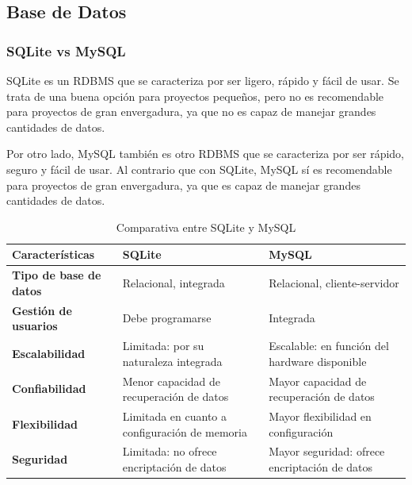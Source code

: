        \subsection{Base de Datos}
        
            \subsubsection{SQLite vs MySQL}

                SQLite \cite{sqlite} es un RDBMS que se caracteriza por ser ligero, rápido y fácil de usar. Se trata de una buena opción para proyectos pequeños, pero no es recomendable para proyectos de gran envergadura, ya que no es capaz de manejar grandes cantidades de datos.
                
                Por otro lado, MySQL \cite{mysql} también es otro RDBMS que se caracteriza por ser rápido, seguro y fácil de usar. Al contrario que con SQLite, MySQL sí es recomendable para proyectos de gran envergadura, ya que es capaz de manejar grandes cantidades de datos.

                \begin{table}[h]
                    \centering
                    
                    \begin{tabular}{|>{\centering\arraybackslash}m{4cm}|>{\centering\arraybackslash}m{5cm}|>{\centering\arraybackslash}m{5cm}|}
                        \hline
                        \textbf{Características} & \textbf{SQLite} & \textbf{MySQL} \\
                        \hline
                        \hline
                        \textbf{Tipo de base de datos} & Relacional, integrada & Relacional, cliente-servidor \\
                        \hline
                        \textbf{Gestión de usuarios} & Debe programarse & Integrada \\
                        \hline
                        \textbf{Escalabilidad} & Limitada: por su naturaleza integrada & Escalable: en función del hardware disponible \\
                        \hline
                        \textbf{Confiabilidad} & Menor capacidad de recuperación de datos & Mayor capacidad de recuperación de datos \\
                        \hline
                        \textbf{Flexibilidad} & Limitada en cuanto a configuración de memoria & Mayor flexibilidad en configuración \\
                        \hline
                        \textbf{Seguridad} & Limitada: no ofrece encriptación de datos & Mayor seguridad: ofrece encriptación de datos \\
                        \hline
                    \end{tabular}
                        
                    \caption{Comparativa entre SQLite y MySQL}
                    \label{tabla:mysql-vs-sqlite}
                \end{table}

